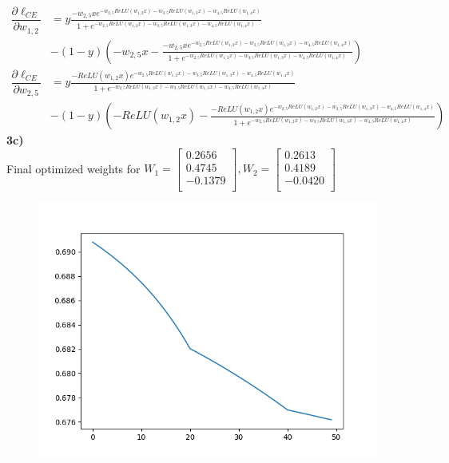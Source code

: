 \documentclass[12pt]{article}
\begin{document}
\begin{align*}
\dfrac{\partial \ell_{CE}}{\partial w_{1, 2}}
&= y\frac{-w_{2,5}xe^{-w_{2, 5}ReLU(w_{1, 2}x)-w_{3, 5}ReLU(w_{1, 3}x)-w_{4, 5}ReLU(w_{1, 4}x)}}{1+e^{-w_{2, 5}ReLU(w_{1, 2}x)-w_{3, 5}ReLU(w_{1, 3}x)-w_{4, 5}ReLU(w_{1, 4}x)}}\\& -(1-y)(-w_{2,5}x - \frac{-w_{2,5}xe^{-w_{2, 5}ReLU(w_{1, 2}x)-w_{3, 5}ReLU(w_{1, 3}x)-w_{4, 5}ReLU(w_{1, 4}x)}}{1+e^{-w_{2, 5}ReLU(w_{1, 2}x)-w_{3, 5}ReLU(w_{1, 3}x)-w_{4, 5}ReLU(w_{1, 4}x)}}) \\ 
\dfrac{\partial \ell_{CE}}{\partial w_{2,5}} &= y\frac{-ReLU(w_{1,2}x)e^{-w_{2, 5}ReLU(w_{1, 2}x)-w_{3, 5}ReLU(w_{1, 3}x)-w_{4, 5}ReLU(w_{1, 4}x)}}{1+e^{-w_{2, 5}ReLU(w_{1, 2}x)-w_{3, 5}ReLU(w_{1, 3}x)-w_{4, 5}ReLU(w_{1, 4}x)}}\\&  -(1-y)(-ReLU(w_{1, 2}x) - \frac{-ReLU(w_{1, 2}x)e^{-w_{2, 5}ReLU(w_{1, 2}x)-w_{3, 5}ReLU(w_{1, 3}x)-w_{4, 5}ReLU(w_{1, 4}x)}}{1+e^{-w_{2, 5}ReLU(w_{1, 2}x)-w_{3, 5}ReLU(w_{1, 3}x)-w_{4, 5}ReLU(w_{1, 4}x)}})
\end{align*}\newpage
\textbf{3c)}\\
Final optimized weights for $W_{1} = \begin{bmatrix}
0.2656\\0.4745\\-0.1379\\
\end{bmatrix}, W_{2} = \begin{bmatrix}
0.2613\\0.4189\\ -0.0420\\\end{bmatrix}$\\
\begin{figure}
\includegraphics[scale=0.5]{train_loss_q3}
\end{figure}\\
\end{document}
